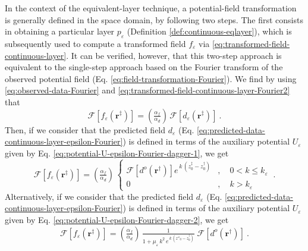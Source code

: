 In the context of the equivalent-layer technique, a potential-field transformation is generally defined
in the space domain, by following two steps. The first consists in obtaining a particular layer $p_{\varepsilon}$ 
(Definition \ref{def:continuous-eqlayer}), which is subsequently used to compute a transformed field $f_{\varepsilon}$ via 
\ref{eq:transformed-field-continuous-layer}.
It can be verified, however, that this two-step approach is equivalent to the single-step approach based on the 
Fourier transform of the observed potential field (Eq. \ref{eq:field-transformation-Fourier}). 
We find by using \ref{eq:observed-data-Fourier} and \ref{eq:transformed-field-continuous-layer-Fourier2} that
\begin{equation}
	\mathcal{F} [ f_{\varepsilon}(\mathbf{r}^{\ddagger}) ] =
	\left( \tfrac{\alpha_{f}}{\alpha_{d}} \right) \, \mathcal{F} [ d_{\varepsilon}(\mathbf{r}^{\ddagger}) ]
	 \: .
	\label{eq:transformed-field-continuous-layer-single-step}
\end{equation}
Then, if we consider that the predicted field $d_{\varepsilon}$ (Eq. \ref{eq:predicted-data-continuous-layer-epsilon-Fourier})
is defined in terms of the auxiliary potential $U_{\varepsilon}$ given by Eq. \ref{eq:potential-U-epsilon-Fourier-dagger-1},
we get
\begin{equation}
	\mathcal{F} [ f_{\varepsilon}(\mathbf{r}^{\ddagger}) ] =
	\left( \tfrac{\alpha_{f}}{\alpha_{d}} \right) \, 
	\begin{cases}
		\mathcal{F} \left[ d^{o}(\mathbf{r}^{\dagger}) \right] 
		e^{\, k \, (z^{\ddagger}_{0} - z^{\dagger}_{0})} & , \quad 0 < k \le k_{\varepsilon} \\
		0 & , \quad k > k_{\varepsilon} 
	\end{cases} \: .
	\label{eq:transformed-field-continuous-layer-1-single-step}
\end{equation}
Alternatively, if we consider that the predicted field $d_{\varepsilon}$ (Eq. \ref{eq:predicted-data-continuous-layer-epsilon-Fourier})
is defined in terms of the auxiliary potential $U_{\varepsilon}$ given by Eq. \ref{eq:potential-U-epsilon-Fourier-dagger-2},
we get
\begin{equation}
	\mathcal{F} [ f_{\varepsilon}(\mathbf{r}^{\ddagger}) ] =
	\left( \tfrac{\alpha_{f}}{\alpha_{d}} \right) \, 
	\tfrac{1}{1 + \mu_{\varepsilon} \, k^{2} \, e^{\, k \, (z''_{0} - z^{\dagger}_{0})}} \;
	\mathcal{F} \left[ d^{o}(\mathbf{r}^{\dagger}) \right] \: .
	\label{eq:transformed-field-continuous-layer-2-single-step}
\end{equation}
